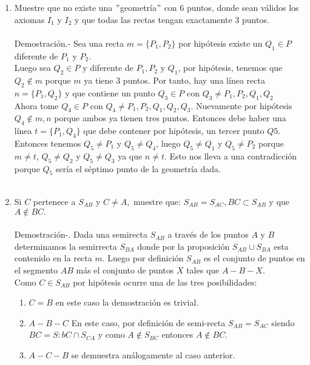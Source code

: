 \documentclass[10pt]{article}
\begin{document}
\begin{enumerate}
    \item Muestre que no existe una $"$geometría$"$ con $6$ puntos, donde sean válidos los axiomas $I_1$ y $I_2$ y que todas las rectas tengan exactamente $3$ puntos.\\\\   
    Demostración.-\; Sea una recta $m=\lbrace P_1,P_2 \rbrace$ por hipótesis existe un $Q_1 \in P$ diferente de $P_1$ y $P_2$.\\
    Luego sea $Q_2 \in P$ y diferente de $P_1,P_2$ y $Q_1$, por hipótesis, tenemos que $Q_2 \notin m$ porque $m$ ya tiene 3 puntos. Por tanto, hay una línea recta $n=\lbrace P_1,Q_2 \rbrace$ y que contiene un punto $Q_3\in P$ con $Q_3\neq P_1,P_2,Q_1,Q_2$\\
    Ahora tome $Q_4 \in P$ con $Q_4 \neq P_1,P_2,Q_1, Q_2,Q_3$. Nuevamente por hipótesis $Q_4 \notin m,n$ porque ambos ya tienen tres puntos. Entonces debe haber una línea $t=\lbrace P_1,Q_4 \rbrace$ que debe contener por hipótesis, un tercer punto $Q5$. Entonces tenemos $Q_5 \neq P_1$ y $Q_5 \neq Q_4$, luego $Q_5 \neq Q_1$ y $Q_5\neq P_2$ porque $m\neq t$, $Q_5\neq Q_2$ y $Q_5\neq Q_3$ ya que $n\neq t$. Esto nos lleva a una contradicción porque $Q_5$ sería el séptimo punto de la geometría dada.\\\\

    \item Si $C$ pertenece a $S_{AB}$ y $C\neq A,$ muestre que: $S_{AB}=S_{AC}, BC \subset S_{AB}$ y que $A \notin BC.$\\\\
    Demostración-.\; Dada una semirecta $S_{AB}$ a través de los puntos $A$ y $B$ determinamos la semirrecta $S_{BA}$ donde por la proposición $S_{AB} \cup S_{BA}$ esta contenido en la recta $m$. Luego por definición $S_{AB}$  es el conjunto de puntos en el segmento $AB$ más el conjunto de puntos $X$ tales que $A-B-X$.\\
    Como $C\in S_{AB}$ por hipótesis ocurre una de las tres posibilidades:
    \begin{enumerate}[\bfseries 1.]
	\item $C=B$ en este caso la demostración es trivial.
	\item $A-B-C$ En este caso, por definición de semi-recta $S_{AB}=S_{AC}$ siendo $BC=S:{bC} \cap S_{CA}$ y como $A\notin S_{BC}$ entonces $A\notin BC$.
	\item $A-C-B$ se demuestra análogamente al caso anterior.\\\\
    \end{enumerate}


\end{enumerate}
\end{document}
